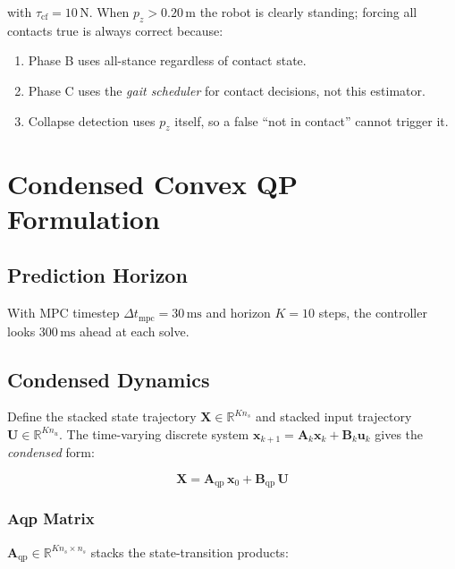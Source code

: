 \documentclass[12pt,a4paper]{report}
\newcommand{\vect}[1]{\bm{#1}}
\newcommand{\mat}[1]{\mathbf{#1}}
\newcommand{\R}{\mathbb{R}}
\begin{document}
with $\tau_\text{cf} = 10\,\text{N}$.  When $p_z > 0.20\,\text{m}$ the robot
is clearly standing; forcing all contacts true is always correct because:
\begin{enumerate}[noitemsep]
  \item Phase B uses all-stance regardless of contact state.
  \item Phase C uses the \emph{gait scheduler} for contact decisions,
        not this estimator.
  \item Collapse detection uses $p_z$ itself, so a false ``not in contact''
        cannot trigger it.
\end{enumerate}

\chapter{Condensed Convex QP Formulation}

\section{Prediction Horizon}

With MPC timestep $\Delta t_\text{mpc} = 30\,\text{ms}$ and horizon $K = 10$
steps, the controller looks $300\,\text{ms}$ ahead at each solve.

\section{Condensed Dynamics}

Define the stacked state trajectory $\mat{X} \in \R^{Kn_s}$ and stacked input
trajectory $\mat{U} \in \R^{Kn_u}$.  The time-varying discrete system
$\vect{x}_{k+1} = \mat{A}_k\vect{x}_k + \mat{B}_k\vect{u}_k$ gives the
\emph{condensed} form:

\begin{equation}
    \mat{X} = \mat{A}_{\mathrm{qp}}\,\vect{x}_0 + \mat{B}_{\mathrm{qp}}\,\mat{U}
    \label{eq:condensed}
\end{equation}

\subsection{Aqp Matrix}

$\mat{A}_{\mathrm{qp}} \in \R^{Kn_s \times n_s}$ stacks the state-transition
products:
\end{document}
